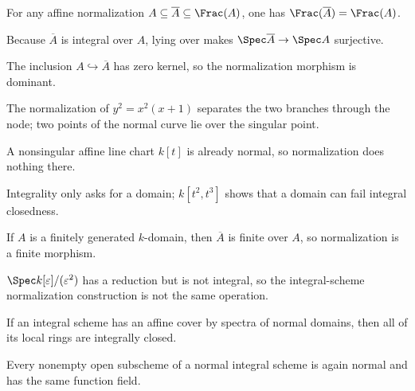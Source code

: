 \begin{example}\label{ex:vi28-11}
For any affine normalization $A\subseteq\overline A\subseteq\Frac(A)$, one has $\Frac(\overline A)=\Frac(A)$.
\end{example}

\begin{example}[Surjectivity]\label{ex:vi28-12}
Because $\overline A$ is integral over $A$, lying over makes $\Spec\overline A\to\Spec A$ surjective.
\end{example}

\begin{example}[Dominance]\label{ex:vi28-13}
The inclusion $A\hookrightarrow\overline A$ has zero kernel, so the normalization morphism is dominant.
\end{example}

\begin{example}\label{ex:vi28-14}
The normalization of $y^2=x^2(x+1)$ separates the two branches through the node; two points of the normal curve lie over the singular point.
\end{example}

\begin{example}\label{ex:vi28-15}
A nonsingular affine line chart $k[t]$ is already normal, so normalization does nothing there.
\end{example}

\begin{example}\label{ex:vi28-16}
Integrality only asks for a domain; $k[t^2,t^3]$ shows that a domain can fail integral closedness.
\end{example}

\begin{example}\label{ex:vi28-17}
If $A$ is a finitely generated $k$-domain, then $\overline A$ is finite over $A$, so normalization is a finite morphism.
\end{example}

\begin{example}\label{ex:vi28-18}
$\Spec k[\varepsilon]/(\varepsilon^2)$ has a reduction but is not integral, so the integral-scheme normalization construction is not the same operation.
\end{example}

\begin{example}\label{ex:vi28-19}
If an integral scheme has an affine cover by spectra of normal domains, then all of its local rings are integrally closed.
\end{example}

\begin{example}\label{ex:vi28-20}
Every nonempty open subscheme of a normal integral scheme is again normal and has the same function field.
\end{example}
